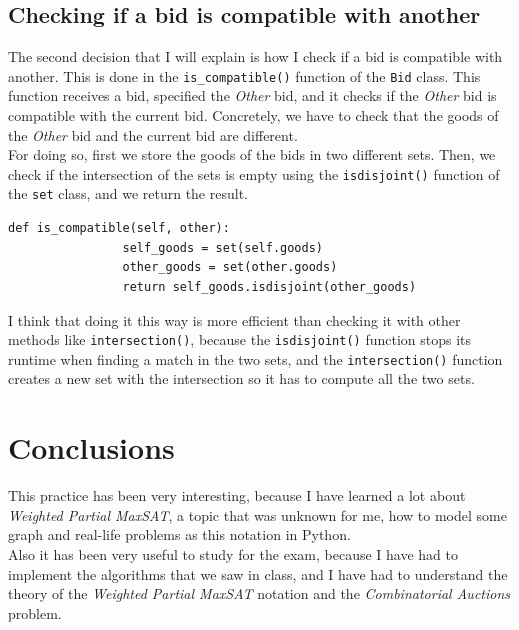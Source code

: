 \documentclass[11pt]{article}
\begin{document}
    \subsection{Checking if a bid is compatible with another}
    \label{subsec:compatiblebids}
        The second decision that I will explain is how I check if a bid is compatible with another.
        This is done in the \verb|is_compatible()| function of the \verb|Bid| class.
        This function receives a bid, specified the \textit{Other} bid, and it checks if the \textit{Other} bid is compatible with the current bid.
        Concretely, we have to check that the goods of the \textit{Other} bid and the current bid are different.\\
        For doing so, first we store the goods of the bids in two different sets.
        Then, we check if the intersection of the sets is empty using the \verb|isdisjoint()| function of the \verb|set| class, and we return the result.\\
        \begin{lstlisting}[label={lst:lstlisting11}]
            def is_compatible(self, other):
                self_goods = set(self.goods)
                other_goods = set(other.goods)
                return self_goods.isdisjoint(other_goods)
        \end{lstlisting}
        I think that doing it this way is more efficient than checking it with other methods like \verb|intersection()|, because the \verb|isdisjoint()| function stops its runtime when finding a match in the two sets, and the \verb|intersection()| function creates a new set with the intersection so it has to compute all the two sets.\\

    \section{Conclusions}
    \label{sec:conclusions}
        This practice has been very interesting, because I have learned a lot about \textit{Weighted Partial MaxSAT}, a topic that was unknown for me, how to model some graph and real-life problems as this notation in Python.\\
        Also it has been very useful to study for the exam, because I have had to implement the algorithms that we saw in class, and I have had to understand the theory of the \textit{Weighted Partial MaxSAT} notation and the \textit{Combinatorial Auctions} problem.\\
\end{document}
